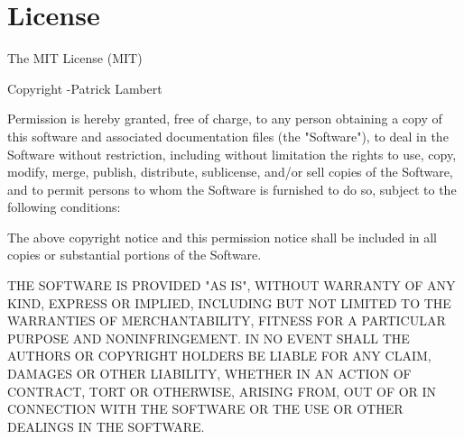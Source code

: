 \documentclass[11pt]{article}
\begin{document}
\clearpage
\section{License}
The MIT License (MIT)

Copyright \textcopyright {}-\the\year \thinspace Patrick Lambert

Permission is hereby granted, free of charge, to any person obtaining a copy
of this software and associated documentation files (the "Software"), to deal
in the Software without restriction, including without limitation the rights
to use, copy, modify, merge, publish, distribute, sublicense, and/or sell
copies of the Software, and to permit persons to whom the Software is
furnished to do so, subject to the following conditions:

The above copyright notice and this permission notice shall be included in
all copies or substantial portions of the Software.

THE SOFTWARE IS PROVIDED "AS IS", WITHOUT WARRANTY OF ANY KIND, EXPRESS OR
IMPLIED, INCLUDING BUT NOT LIMITED TO THE WARRANTIES OF MERCHANTABILITY,
FITNESS FOR A PARTICULAR PURPOSE AND NONINFRINGEMENT. IN NO EVENT SHALL THE
AUTHORS OR COPYRIGHT HOLDERS BE LIABLE FOR ANY CLAIM, DAMAGES OR OTHER
LIABILITY, WHETHER IN AN ACTION OF CONTRACT, TORT OR OTHERWISE, ARISING FROM,
OUT OF OR IN CONNECTION WITH THE SOFTWARE OR THE USE OR OTHER DEALINGS IN
THE SOFTWARE.
\end{document}
